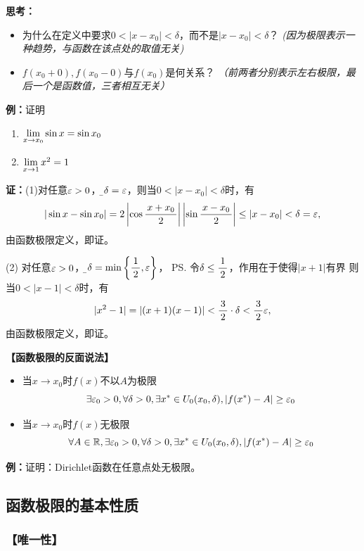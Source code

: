 {\bf 思考：}
\begin{itemize}
  \setlength{\itemindent}{1cm}
  \item 为什么在定义中要求$0<|x-x_0|<\delta$，而不是$|x-x_0|<\delta$？
  {\it (因为极限表示一种趋势，与函数在该点处的取值无关)}
  \item $f(x_0+0),f(x_0-0)$与$f(x_0)$是何关系？
  {\it（前两者分别表示左右极限，最后一个是函数值，三者相互无关）}
\end{itemize}

{\bf 例：}证明
\begin{enumerate}[(1)]
  \setlength{\itemindent}{1cm}
  \item $\lim\limits_{x\to{x_0}}\sin x=\sin x_0$
  \item $\lim\limits_{x\to{1}}x^2=1$
\end{enumerate}

{\bf 证：}(1)对任意$\varepsilon>0$，令{\b$\delta=\varepsilon$}，则当$0<|x-x_0|<\delta$时，有
$$|\sin x-\sin x_0|=2\left|\cos\displaystyle\frac{\,{x+x_0}\,}{\,{2}\,}\right|
\left|\sin\displaystyle\frac{\,{x-x_0}\,}{\,{2}\,}\right|\leq|x-x_0|<\delta=\varepsilon,$$
由函数极限定义，即证。

(2) 对任意$\varepsilon>0$，令{\b$\delta=\min\left\{\displaystyle\frac{\,{1}\,}{\,{2}\,},\varepsilon\right\}$}，
\ps{令$\delta\leq\displaystyle\frac{\,{1}\,}{\,{2}\,}$，作用在于使得$|x+1|$有界}
则当$0<|x-1|<\delta$时，有
$$|x^2-1|=|(x+1)(x-1)|<\displaystyle\frac{\,{3}\,}{\,{2}\,}\cdot\delta<\displaystyle\frac{\,{3}\,}{\,{2}\,}\varepsilon,$$
由函数极限定义，即证。

\begin{shaded}
	{\bf 【函数极限的反面说法】}
	
	\begin{itemize}
	  \item 当$x\to x_0$时$f(x)$不以$A$为极限 
	    $$\exists\varepsilon_0>0,\forall\delta>0, \exists x^*\in
	    U_0(x_0,\delta),|f(x^*)-A|\geq\varepsilon_0$$ 
	  \item 当$x\to x_0$时$f(x)$无极限
		$$\forall A\in\mathbb{R},\exists\varepsilon_0>0,\forall\delta>0, \exists x^*\in
	    U_0(x_0,\delta),|f(x^*)-A|\geq\varepsilon_0$$ 
	\end{itemize}
	
	{\bf 例：}证明：Dirichlet函数在任意点处无极限。
\end{shaded}

\subsection{函数极限的基本性质}

\subsubsection{【唯一性】}

